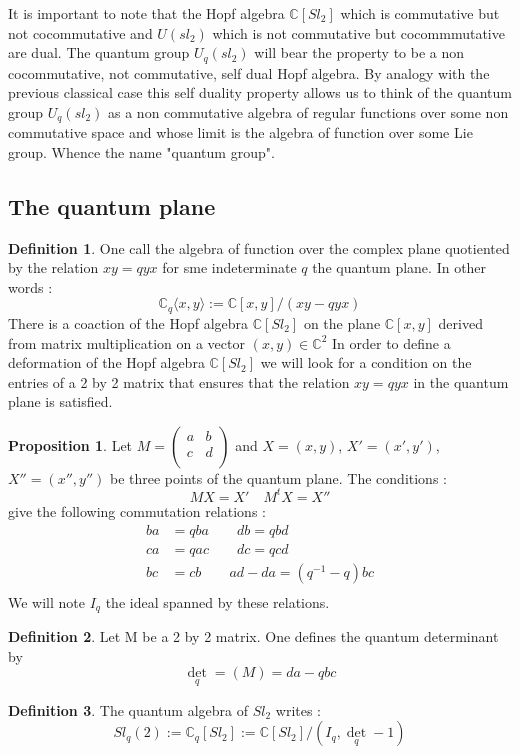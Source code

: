 \documentclass{article}
\theoremstyle{definition}
\newtheorem{Prop}{Proposition}[section]
\newtheorem{Def}{Definition}[section]
\begin{document}
It is important to note that the Hopf algebra $\mathbb{C}[Sl_2]$ which is commutative but not cocommutative and $U(sl_2)$ which is not commutative but cocommmutative are dual. The quantum group $U_q(sl_2)$ will bear the property to be a non cocommutative, not commutative, self dual Hopf algebra. By analogy with the previous classical case this self duality property allows us to think of the quantum group $U_q(sl_2)$ as a non commutative algebra of regular functions over some non commutative space and whose limit is the algebra of function over some Lie group. Whence the name "quantum group".
\subsection{The quantum plane}
\begin{Def} One call the algebra of function over the complex plane quotiented by the relation $xy=qyx$ for sme indeterminate $q$ the quantum plane. In other words : $$\mathbb{C}_q\langle x,y\rangle:=\mathbb{C}[x,y]/(xy-qyx)$$
There is a coaction of the Hopf algebra $\mathbb{C}[Sl_2]$ on the plane $\mathbb{C}[x,y]$ derived from matrix multiplication on a vector $(x,y)\in\mathbb{C}^2$ In order to define a deformation of the Hopf algebra $\mathbb{C}[Sl_2]$ we will look for a condition on the entries of a 2 by 2 matrix  that ensures that the relation $xy=qyx$ in the quantum plane is satisfied. \begin{Prop} Let $M=
  \left( {\begin{array}{cc}
   a & b \\
   c & d \\
  \end{array} } \right)$ and $X=(x,y)$, $X'=(x',y')$, $X''=(x'',y'')$ be three points of the quantum plane. The conditions : $$MX=X'\quad M^tX=X''$$ give the following commutation relations :\begin{align*} ba&=qba\qquad db=qbd \\
  ca&=qac\qquad dc=qcd\\
  bc&=cb\qquad ad-da=(q^{-1}-q)bc\\
\end{align*}
We will note $I_q$ the ideal spanned by these relations. 
\end{Prop}
\end{Def}
\begin{Def} Let M be a 2 by 2 matrix. One defines the quantum determinant by $$\det_q=(M)=da-qbc$$ 
\end{Def}
\begin{Def} The quantum algebra of $Sl_2$ writes : $$Sl_q(2):=\mathbb{C}_q[Sl_2]:=\mathbb{C}[Sl_2]/(I_q,\det_q-1)$$
\end{Def}
\end{document}
